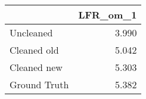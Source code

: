 \begin{tabular}{lr}
\toprule
{} & LFR_om_1 \\
\midrule
Uncleaned    &    3.990 \\
Cleaned old  &    5.042 \\
Cleaned new  &    5.303 \\
Ground Truth &    5.382 \\
\bottomrule
\end{tabular}
